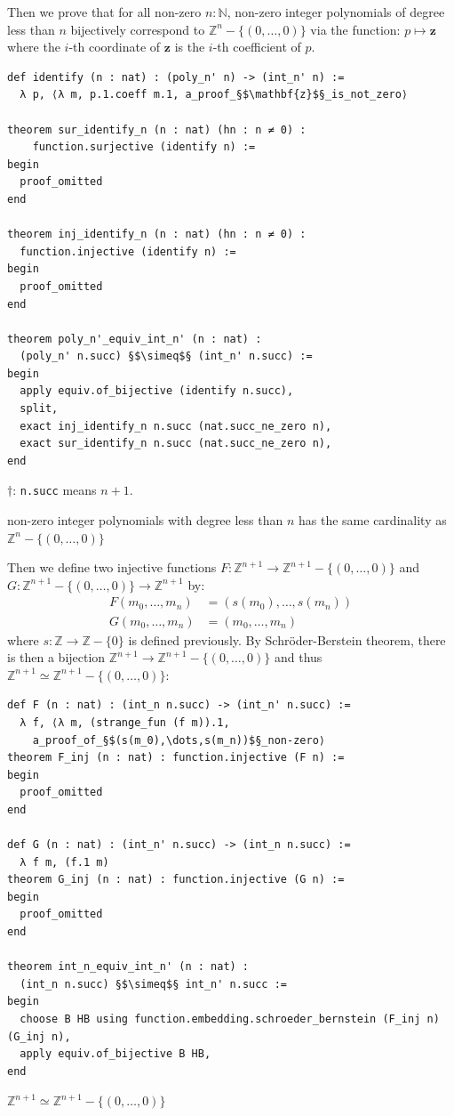 \documentclass{report}
\theoremstyle{definition}
\newenvironment{code}{\captionsetup{type=listing}}{}
\begin{document}
Then we prove that for all non-zero $n:\mathbb N$, non-zero integer polynomials of degree less than $n$ bijectively correspond to $\mathbb Z^n-\{(0,\dots,0)\}$ via the function:
$p\mapsto \mathbf{z}$ where the $i$-th coordinate of $\mathbf{z}$ is the $i$-th coefficient of $p$.
\begin{code}
\begin{verbatim}
def identify (n : nat) : (poly_n' n) -> (int_n' n) := 
  λ p, ⟨λ m, p.1.coeff m.1, a_proof_§$\mathbf{z}$§_is_not_zero⟩

theorem sur_identify_n (n : nat) (hn : n ≠ 0) : 
    function.surjective (identify n) :=
begin
  proof_omitted
end

theorem inj_identify_n (n : nat) (hn : n ≠ 0) : 
  function.injective (identify n) :=
begin
  proof_omitted
end

theorem poly_n'_equiv_int_n' (n : nat) : 
  (poly_n' n.succ) §$\simeq$§ (int_n' n.succ) :=
begin
  apply equiv.of_bijective (identify n.succ),
  split,
  exact inj_identify_n n.succ (nat.succ_ne_zero n),
  exact sur_identify_n n.succ (nat.succ_ne_zero n),
end
\end{verbatim}
$\dagger$: {\tt\small n.succ} means $n+1$.
\caption{non-zero integer polynomials with degree less than $n$ has the same cardinality as $\mathbb Z^n-\{(0,\dots,0)\}$}
\end{code}

Then we define two injective functions $F : \mathbb{Z}^{n+1}\to\mathbb{Z}^{n+1}-\{(0,\dots,0)\}$ and $G : \mathbb{Z}^{n+1}-\{(0,\dots,0)\}\to\mathbb{Z}^{n+1}$ by:
\begin{equation*}
\begin{aligned}
F (m_0,\dots,m_n) &= (s(m_0),\dots,s(m_n)) \\
G (m_0,\dots,m_n) &= (m_0,\dots,m_n)
\end{aligned}
\end{equation*}
where $s:\mathbb Z\to \mathbb Z-\{0\}$ is defined previously. By Schröder-Berstein theorem, there is then a bijection $\mathbb{Z}^{n+1}\to\mathbb{Z}^{n+1}-\{(0,\dots,0)\}$ and thus $\mathbb{Z}^{n+1}\simeq\mathbb{Z}^{n+1}-\{(0,\dots,0)\}$:
\begin{code}
\begin{verbatim}
def F (n : nat) : (int_n n.succ) -> (int_n' n.succ) := 
  λ f, ⟨λ m, (strange_fun (f m)).1,
    a_proof_of_§$(s(m_0),\dots,s(m_n))$§_non-zero⟩
theorem F_inj (n : nat) : function.injective (F n) :=
begin
  proof_omitted
end

def G (n : nat) : (int_n' n.succ) -> (int_n n.succ) := 
  λ f m, (f.1 m)
theorem G_inj (n : nat) : function.injective (G n) :=
begin
  proof_omitted
end

theorem int_n_equiv_int_n' (n : nat) : 
  (int_n n.succ) §$\simeq$§ int_n' n.succ :=
begin
  choose B HB using function.embedding.schroeder_bernstein (F_inj n) (G_inj n),
  apply equiv.of_bijective B HB,
end
\end{verbatim}
\caption{$\mathbb{Z}^{n+1}\simeq\mathbb{Z}^{n+1}-\{(0,\dots,0)\}$}
\end{code}
\end{document}
